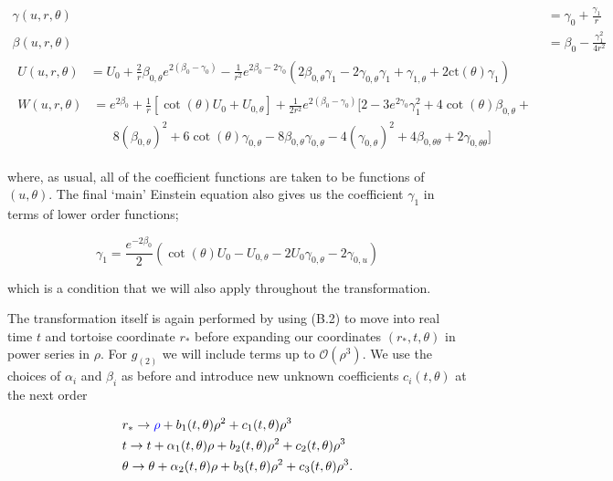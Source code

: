 \documentclass[a4paper,11pt]{article}
\numberwithin{equation}{section}
\begin{document}
\begin{subequations}
\begin{align}
\gamma(u,r,\theta)&=\gamma_{0}+ \frac{\gamma_1}{r}\\
\beta(u,r,\theta)&=\beta_{0}-\frac{\gamma_1^2}{4r^2} \\
\begin{split}
U(u,r,\theta)&=U_{0}+\frac{2}{r}\beta_{0, \theta} e^{2( \beta_0- \gamma_0)} -  \frac{1}{r^2}e^{2 \beta_0-2 \gamma_0} (2 \beta_{0,\theta} \gamma_1-2 \gamma_{0,\theta}\gamma_1+\gamma_{1,\theta}+2 \text{ct}(\theta ) \gamma_1)
\end{split}\\
\begin{split}
W(u,r,\theta)&=e^{2\beta_{0}}+\frac{1}{r}[\cot(\theta)U_{0}+U_{0,\theta}]+ \frac{1}{2r^2}e^{2(\beta_{0}-\gamma_{0})}[2-3e^{2\gamma_0}\gamma_1^2+4\cot(\theta)\beta_{0,\theta}+\\
&\phantom{aaa}8(\beta_{0,\theta})^2+6\cot(\theta)\gamma_{0,\theta}-8\beta_{0,\theta}\gamma_{0,\theta}-4(\gamma_{0,\theta})^2+4\beta_{0,\theta \theta}+2\gamma_{0,\theta \theta}]
\end{split}
\end{align}
\end{subequations}

\noindent where, as usual, all of the coefficient functions are taken to be functions of $(u,\theta)$. The final `main' Einstein equation also gives us the coefficient $\gamma_1$ in terms of lower order functions;
 
\begin{equation}
\gamma_1=\frac{e^{-2\beta_0}}{2}(\cot(\theta)U_0-U_{0,\theta}-2U_0\gamma_{0,\theta}-2\gamma_{0,u}) 
\end{equation}

\noindent which is a condition that we will also apply throughout the transformation. \par


The transformation itself is again performed by using (B.2) to move into real time $t$ and tortoise coordinate $r_*$  before expanding our coordinates $(r_*, t, \theta)$ in power series in $\rho$. For $g_{(2)}$ we will include terms up to $\mathcal{O}(\rho^3)$. We use the choices of $\alpha_i$ and $\beta_i$ as before and introduce new unknown coefficients $c_i(t,\theta)$ at the next order

\begin{align}
\begin{split}
&r_* \rightarrow \textcolor{blue}{\rho}  + b_1(t,\theta) \rho^2+c_1(t,\theta) \rho^3 \\
&t \rightarrow t + \alpha_1(t,\theta)\rho + b_2(t,\theta) \rho^2+c_2(t,\theta) \rho^3 \\
&\theta \rightarrow \theta + \alpha_2(t,\theta)\rho + b_3(t,\theta) \rho^2+c_3(t,\theta) \rho^3. 
\end{split}
\end{align}
\end{document}
